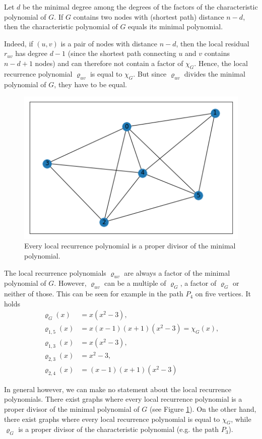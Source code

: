 \documentclass[a4paper,12pt]{article}
\begin{document}
\begin{cor}
Let $d$ be the minimal degree among the degrees of the factors of the characteristic polynomial of $G$. If $G$ contains two nodes with (shortest path) distance $n-d$, then the characteristic polynomial of $G$ equals its minimal polynomial.
\end{cor}

Indeed, if $(u,v)$ is a pair of nodes with distance $n-d$, then the local residual $r_{uv}$ has degree $d-1$ (since the shortest path connecting $u$ and $v$ contains $n-d+1$ nodes) and can therefore not contain a factor of $\chi_G$. Hence, the local recurrence polynomial $\varrho_{uv}$ is equal to $\chi_G$. But since $\varrho_{uv}$ divides the minimal polynomial of $G$, they have to be equal.

\begin{figure}
\centering
\includegraphics[scale=0.5]{pics/graph2.png}
\caption{Every local recurrence polynomial is a proper divisor of the minimal polynomial.}
\label{fig:proper_div}
\end{figure}

\begin{remark}
The local recurrence polynomials $\varrho_{uv}$ are always a factor of the minimal polynomial of $G$. However, $\varrho_{uv}$ can be a multiple of $\varrho_G$, a factor of $\varrho_G$ or neither of those. This can be seen for example in the path $P_4$ on five vertices. It holds
\begin{align*}
\varrho_G(x) &= x(x^2-3),\\
\varrho_{1,5}(x) &= x(x-1)(x+1)(x^2-3) = \chi_G(x),\\
\varrho_{1,3}(x) &= x(x^2-3),\\
\varrho_{2,3}(x) &= x^2-3,\\
\varrho_{2,4}(x) &= (x-1)(x+1)(x^2-3)
\end{align*}

In general however, we can make no statement about the local recurrence polynomials. There exist graphs where every local recurrence polynomial is a proper divisor of the minimal polynomial of $G$ (see Figure \ref{fig:proper_div}). On the other hand, there exist graphs where every local recurrence polynomial is equal to $\chi_G$, while $\varrho_G$ is a proper divisor of the characteristic polynomial (e.g. the path $P_3$).
\end{remark}
\end{document}
